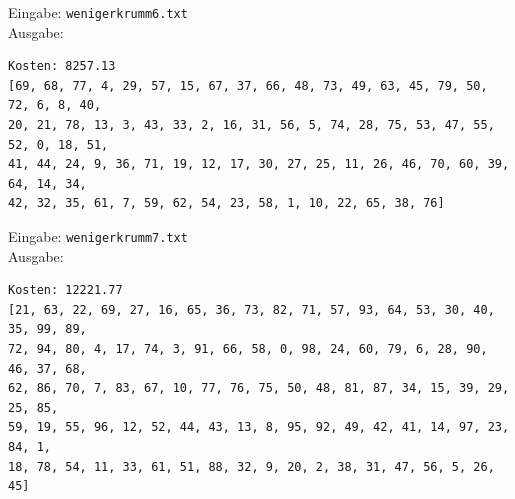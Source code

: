 \documentclass[a4paper,10pt,ngerman]{scrartcl}
\begin{document}
Eingabe: \lstinline|wenigerkrumm6.txt| \\ Ausgabe:
\begin{lstlisting}
Kosten: 8257.13
[69, 68, 77, 4, 29, 57, 15, 67, 37, 66, 48, 73, 49, 63, 45, 79, 50, 72, 6, 8, 40, 
20, 21, 78, 13, 3, 43, 33, 2, 16, 31, 56, 5, 74, 28, 75, 53, 47, 55, 52, 0, 18, 51,
41, 44, 24, 9, 36, 71, 19, 12, 17, 30, 27, 25, 11, 26, 46, 70, 60, 39, 64, 14, 34,
42, 32, 35, 61, 7, 59, 62, 54, 23, 58, 1, 10, 22, 65, 38, 76]
\end{lstlisting}
Eingabe: \lstinline|wenigerkrumm7.txt| \\ Ausgabe:
\begin{lstlisting}
Kosten: 12221.77
[21, 63, 22, 69, 27, 16, 65, 36, 73, 82, 71, 57, 93, 64, 53, 30, 40, 35, 99, 89,
72, 94, 80, 4, 17, 74, 3, 91, 66, 58, 0, 98, 24, 60, 79, 6, 28, 90, 46, 37, 68,
62, 86, 70, 7, 83, 67, 10, 77, 76, 75, 50, 48, 81, 87, 34, 15, 39, 29, 25, 85, 
59, 19, 55, 96, 12, 52, 44, 43, 13, 8, 95, 92, 49, 42, 41, 14, 97, 23, 84, 1, 
18, 78, 54, 11, 33, 61, 51, 88, 32, 9, 20, 2, 38, 31, 47, 56, 5, 26, 45]
\end{lstlisting}
\end{document}
